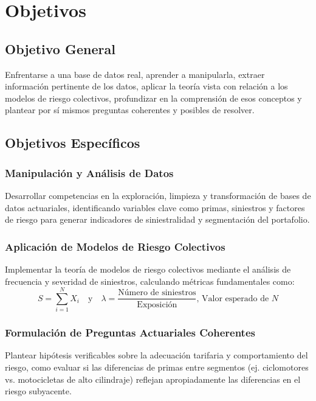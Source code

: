 \section{Objetivos}

\subsection{Objetivo General}
Enfrentarse a una base de datos real, aprender a manipularla, extraer información pertinente de los datos, aplicar la teoría vista con relación a los modelos de riesgo colectivos, profundizar en la comprensión de esos conceptos y plantear por sí mismos preguntas coherentes y posibles de resolver.
\subsection{Objetivos Específicos}
\subsubsection{Manipulación y Análisis de Datos}
Desarrollar competencias en la exploración, limpieza y transformación de bases de datos actuariales, identificando variables clave como primas, siniestros y factores de riesgo para generar indicadores de siniestralidad y segmentación del portafolio.
\subsubsection{Aplicación de Modelos de Riesgo Colectivos}
Implementar la teoría de modelos de riesgo colectivos mediante el análisis de frecuencia y severidad de siniestros, calculando métricas fundamentales como:
\begin{equation*}
S = \sum_{i=1}^{N} X_i \quad \text{y} \quad \lambda = \frac{\text{Número de siniestros}}{\text{Exposición}} \text{, Valor esperado de $N$}
\end{equation*}
\subsubsection{Formulación de Preguntas Actuariales Coherentes}
Plantear hipótesis verificables sobre la adecuación tarifaria y comportamiento del riesgo, como evaluar si las diferencias de primas entre segmentos (ej. ciclomotores vs. motocicletas de alto cilindraje) reflejan apropiadamente las diferencias en el riesgo subyacente.